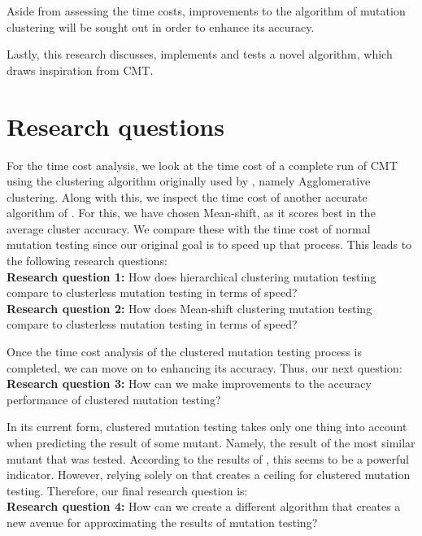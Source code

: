 \documentclass[twoside]{uva-inf-bachelor-thesis}
\begin{document}
Aside from assessing the time costs, improvements to the algorithm of mutation clustering will be sought out in order to enhance its accuracy.

Lastly, this research discusses, implements and tests a novel algorithm, which draws inspiration from CMT.

\section{Research questions}
For the time cost analysis, we look at the time cost of a complete run of CMT using the clustering algorithm originally used by \textcite{Basarat21}, namely Agglomerative clustering. Along with this, we inspect the time cost of another accurate algorithm of \textcite{Mouissie22}. For this, we have chosen Mean-shift, as it scores best in the average cluster accuracy. We compare these with the time cost of normal mutation testing since our original goal is to speed up that process. This leads to the following research questions:\\
\textbf{Research question 1:} How does hierarchical clustering mutation testing compare to clusterless mutation testing in terms of speed?\\
\textbf{Research question 2:} How does Mean-shift clustering mutation testing compare to clusterless mutation testing in terms of speed?

Once the time cost analysis of the clustered mutation testing process is completed, we can move on to enhancing its accuracy. Thus, our next question:\\
\textbf{Research question 3:} How can we make improvements to the accuracy performance of clustered mutation testing?

In its current form, clustered mutation testing takes only one thing into account when predicting the result of some mutant. Namely, the result of the most similar mutant that was tested. According to the results of \textcite{Basarat21}, this seems to be a powerful indicator. However, relying solely on that creates a ceiling for clustered mutation testing. Therefore, our final research question is:\\
\textbf{Research question 4:} How can we create a different algorithm that creates a new avenue for approximating the results of mutation testing?\\
\end{document}
